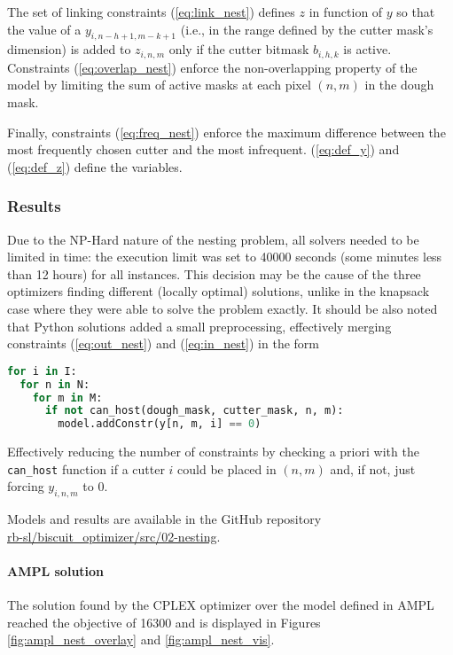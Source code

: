 The set of linking constraints (\ref{eq:link_nest}) defines $z$ in function of $y$ so that the value of a $y_{i, n-h+1, m-k+1}$ (i.e., in the range defined by the cutter mask's dimension) is added to $z_{i, n, m}$ only if the cutter bitmask $b_{i, h, k}$ is active. Constraints (\ref{eq:overlap_nest}) enforce the non-overlapping property of the model by limiting the sum of active masks at each pixel $(n, m)$ in the dough mask.

Finally, constraints (\ref{eq:freq_nest}) enforce the maximum difference between the most frequently chosen cutter and the most infrequent. (\ref{eq:def_y}) and (\ref{eq:def_z}) define the variables.

\subsubsection{Results}
Due to the NP-Hard nature of the nesting problem, all solvers needed to be limited in time: the execution limit was set to 40000 seconds (some minutes less than 12 hours) for all instances. This decision may be the cause of the three optimizers finding different (locally optimal) solutions, unlike in the knapsack case where they were able to solve the problem exactly. It should be also noted that Python solutions added a small preprocessing, effectively merging constraints (\ref{eq:out_nest}) and (\ref{eq:in_nest}) in the form
\begin{lstlisting}[language=Python]
for i in I:
  for n in N:
    for m in M:
      if not can_host(dough_mask, cutter_mask, n, m):
        model.addConstr(y[n, m, i] == 0)
\end{lstlisting}
Effectively reducing the number of constraints by checking a priori with the \texttt{can\_host} function if a cutter $i$ could be placed in $(n, m)$ and, if not, just forcing $y_{i, n, m}$ to 0.

Models and results are available in the GitHub repository \\ \href{https://github.com/rb-sl/biscuit_optimizer/tree/main/src/02-nesting}{rb-sl/biscuit\_optimizer/src/02-nesting}.

\paragraph{AMPL solution}
The solution found by the CPLEX optimizer over the model defined in AMPL reached the objective of 16300 and is displayed in Figures \ref{fig:ampl_nest_overlay} and \ref{fig:ampl_nest_vis}.

